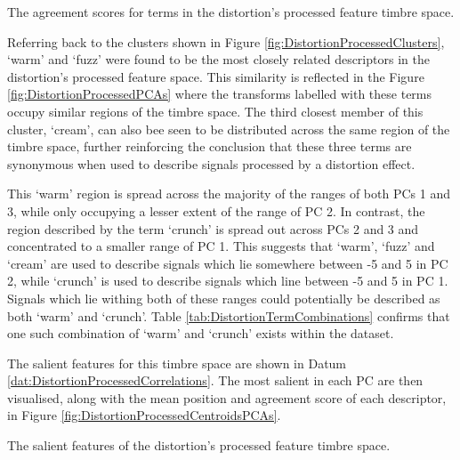 			\begin{table}[h!]
				\centering
				
				\caption{The agreement scores for terms in the 
					 distortion's processed feature timbre space.}
				\label{tab:DistortionProcessedAgreements}
			\end{table}

			Referring back to the clusters shown in Figure \ref{fig:DistortionProcessedClusters}, `warm' and
			`fuzz' were found to be the most closely related descriptors in the distortion's processed feature
			space. This similarity is reflected in the Figure \ref{fig:DistortionProcessedPCAs} where the
			transforms labelled with these terms occupy similar regions of the timbre space. The third closest
			member of this cluster, `cream', can also bee seen to be distributed across the same region of the
			timbre space, further reinforcing the conclusion that these three terms are synonymous when used to
			describe signals processed by a distortion effect.

			This `warm' region is spread across the majority of the ranges of both PCs 1 and 3, while only
			occupying a lesser extent of the range of PC 2. In contrast, the region described by the term
			`crunch' is spread out across PCs 2 and 3 and concentrated to a smaller range of PC 1. This
			suggests that `warm', `fuzz' and `cream' are used to describe signals which lie somewhere between
			-5 and 5 in PC 2, while `crunch' is used to describe signals which line between -5 and 5 in PC 1.
			Signals which lie withing both of these ranges could potentially be described as both `warm' and
			`crunch'. Table \ref{tab:DistortionTermCombinations} confirms that one such combination of
			`warm' and `crunch' exists within the dataset.

			The salient features for this timbre space are shown in Datum
			\ref{dat:DistortionProcessedCorrelations}. The most salient in each PC are then visualised, along
			with the mean position and agreement score of each descriptor, in Figure
			\ref{fig:DistortionProcessedCentroidsPCAs}. 

			\begin{datum}[h!]
				\centering
				\begin{minipage}{0.9\textwidth}
					
				\end{minipage}
				\caption{The salient features of the distortion's 
					 processed feature timbre space.}
				\label{dat:DistortionProcessedCorrelations}
			\end{datum}

